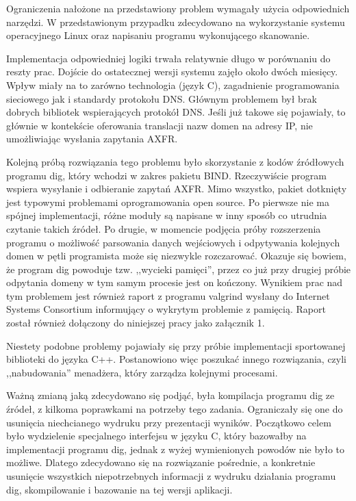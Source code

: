 Ograniczenia nałożone na przedstawiony problem wymagały użycia odpowiednich narzędzi. W przedstawionym przypadku zdecydowano na wykorzystanie systemu operacyjnego Linux oraz napisaniu programu wykonującego skanowanie.

Implementacja odpowiedniej logiki trwała relatywnie długo w porównaniu do reszty prac. Dojście do ostatecznej wersji systemu zajęło około dwóch miesięcy. Wpływ miały na to zarówno technologia (język C), zagadnienie programowania sieciowego jak i standardy protokołu DNS. Głównym problemem był brak dobrych bibliotek wspierających protokół DNS. Jeśli już takowe się pojawiały, to głównie w kontekście oferowania translacji nazw domen na adresy IP, nie umożliwiając wysłania zapytania AXFR. 

Kolejną próbą rozwiązania tego problemu było skorzystanie z kodów źródłowych programu dig, który wchodzi w zakres pakietu BIND. Rzeczywiście program wspiera wysyłanie i odbieranie zapytań AXFR. Mimo wszystko, pakiet dotknięty jest typowymi problemami oprogramowania open source. Po pierwsze nie ma spójnej implementacji, różne moduły są napisane w inny sposób co utrudnia czytanie takich źródeł. Po drugie, w momencie podjęcia próby rozszerzenia programu o możliwość parsowania danych wejściowych i odpytywania kolejnych domen w pętli programista może się niezwykle rozczarować. Okazuje się bowiem, że program dig powoduje tzw. ,,wycieki pamięci'', przez co już przy drugiej próbie odpytania domeny w tym samym procesie jest on kończony. Wynikiem prac nad tym problemem jest również raport z programu valgrind wysłany do Internet Systems Consortium informujący o wykrytym problemie z pamięcią. Raport został również dołączony do niniejszej pracy jako załącznik 1.

Niestety podobne problemy pojawiały się przy próbie implementacji sportowanej biblioteki do języka C++. Postanowiono więc poszukać innego rozwiązania, czyli ,,nabudowania'' menadżera, który zarządza kolejnymi procesami.

Ważną zmianą jaką zdecydowano się podjąć, była kompilacja programu dig ze źródeł, z kilkoma poprawkami na potrzeby tego zadania. Ograniczały się one do usunięcia niechcianego wydruku przy prezentacji wyników. Początkowo celem było wydzielenie specjalnego interfejsu w języku C, który bazowałby na implementacji programu dig, jednak z wyżej wymienionych powodów nie było to możliwe. Dlatego zdecydowano się na rozwiązanie pośrednie, a konkretnie usunięcie wszystkich niepotrzebnych informacji z wydruku działania programu dig, skompilowanie i bazowanie na tej wersji aplikacji.  

